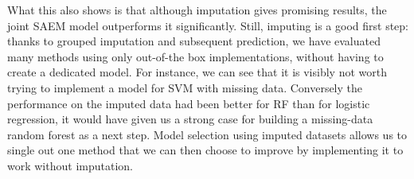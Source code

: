 What this also shows is that although imputation gives promising results, the joint SAEM model outperforms it significantly.
Still, imputing is a good first step: thanks to grouped imputation and subsequent prediction, we have evaluated many methods using only out-of-the box implementations, without having to create a dedicated model. For instance, we can see that it is visibly not worth trying to implement a model for SVM with missing data. Conversely the performance on the imputed data had been better for RF than for logistic regression, it would have given us a strong case for building a missing-data random forest as a next step. Model selection using imputed datasets allows us to single out one method that we can then choose to improve by implementing it to work without imputation. 
